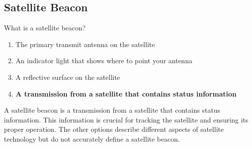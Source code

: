 \subsection{Satellite Beacon}
\label{T8B05}

\begin{tcolorbox}[colback=gray!10!white,colframe=black!75!black,title=T8B05]
What is a satellite beacon?
\begin{enumerate}[noitemsep]
    \item The primary transmit antenna on the satellite
    \item An indicator light that shows where to point your antenna
    \item A reflective surface on the satellite
    \item \textbf{A transmission from a satellite that contains status information}
\end{enumerate}
\end{tcolorbox}

A satellite beacon is a transmission from a satellite that contains status information. This information is crucial for tracking the satellite and ensuring its proper operation. The other options describe different aspects of satellite technology but do not accurately define a satellite beacon.